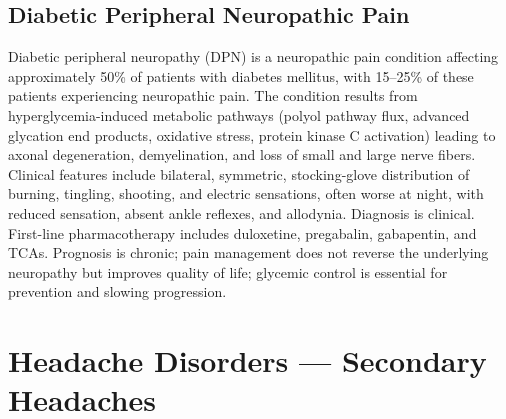 \subsection{Diabetic Peripheral Neuropathic Pain}
\label{sec:Diabetic Peripheral Neuropathic Pain}
Diabetic peripheral neuropathy (DPN) is a neuropathic pain condition affecting approximately 50\% of patients with diabetes mellitus, with 15--25\% of these patients experiencing neuropathic pain. The condition results from hyperglycemia-induced metabolic pathways (polyol pathway flux, advanced glycation end products, oxidative stress, protein kinase C activation) leading to axonal degeneration, demyelination, and loss of small and large nerve fibers. Clinical features include bilateral, symmetric, stocking-glove distribution of burning, tingling, shooting, and electric sensations, often worse at night, with reduced sensation, absent ankle reflexes, and allodynia. Diagnosis is clinical. First-line pharmacotherapy includes duloxetine, pregabalin, gabapentin, and TCAs. Prognosis is chronic; pain management does not reverse the underlying neuropathy but improves quality of life; glycemic control is essential for prevention and slowing progression.

\section{Headache Disorders --- Secondary Headaches}








\label{sec:Headache Disorders --- Secondary Headaches}

